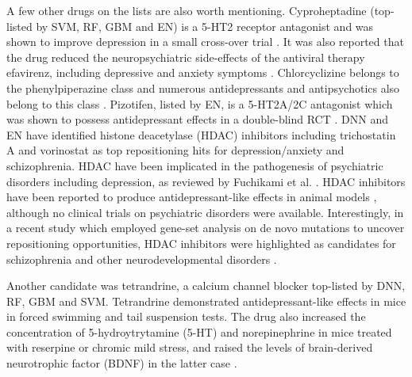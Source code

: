       A few other drugs on the lists are also worth mentioning. Cyproheptadine (top-listed by SVM, RF, GBM and EN) is a 5-HT2 receptor antagonist and was shown to improve depression in a small cross-over trial \cite{green2012modeling}. It was also reported that the drug reduced the neuropsychiatric side-effects of the antiviral therapy efavirenz, including depressive and anxiety symptoms \cite{dabaghzadeh2013cyproheptadine}. Chlorcyclizine belongs to the phenylpiperazine class and numerous antidepressants and antipsychotics also belong to this class \cite{maia2012phenylpiperazine}. Pizotifen, listed by EN, is a 5-HT2A/2C antagonist which was shown to possess antidepressant effects in a double-blind RCT \cite{standal1977pizotifen}. DNN and EN have identified histone deacetylase (HDAC) inhibitors including trichostatin A and vorinostat as top repositioning hits for depression/anxiety and schizophrenia. HDAC have been implicated in the pathogenesis of psychiatric disorders including depression, as reviewed by Fuchikami et al. \cite{fuchikami2016potential}. HDAC inhibitors have been reported to produce antidepressant-like effects in animal models \cite{hobara2010molecular,covington2009antidepressant}, although no clinical trials on psychiatric disorders were available. Interestingly, in a recent study which employed gene-set analysis on de novo mutations to uncover repositioning opportunities, HDAC inhibitors were highlighted as candidates for schizophrenia and other neurodevelopmental disorders \cite{so2019implications}. 

      Another candidate was tetrandrine, a calcium channel blocker top-listed by DNN, RF, GBM and SVM. Tetrandrine demonstrated antidepressant-like effects in mice \cite{gao2013tetrandrine} in forced swimming and tail suspension tests. The drug also increased the concentration of 5-hydroytrytamine (5-HT) and norepinephrine in mice treated with reserpine or chromic mild stress, and raised the levels of brain-derived neurotrophic factor (BDNF) in the latter case \cite{gao2013tetrandrine}.  
  
